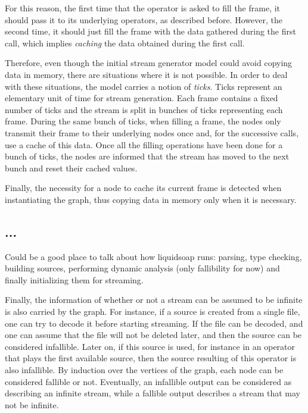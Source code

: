 \documentclass{llncs}
\begin{document}
For this reason, the first time that the operator is asked to fill the frame, it should pass it to its 
underlying operators, as described before. However, the second time, it should just fill the frame 
with the data gathered during the first call, which implies \textit{caching} the data obtained during the first call.

Therefore, even though the initial stream generator model could avoid copying data in memory, there 
are situations where it is not possible. In order to deal with these situations, the 
model carries a notion of \textit{ticks}. Ticks represent an elementary unit of time
for stream generation. Each frame contains a fixed number of ticks and the stream is split
in bunches of ticks representing each frame. During the same bunch of ticks, when filling a frame, the nodes only 
transmit their frame to their underlying nodes once and, for the successive calls, use a cache of this data. 
Once all the filling operations have been done for a bunch of ticks, the nodes are informed that the 
stream has moved to the next bunch and reset their cached values. 

Finally, the necessity for a node to cache its current frame is detected when instantiating the graph, thus
copying data in memory only when it is necessary.

\subsection{...}

Could be a good place to talk about how liquidsoap runs: parsing, type 
checking, building sources, performing dynamic analysis (only fallibility for 
now) and finally initializing them for streaming.

Finally, the information of whether or not a stream can be assumed to be infinite is also carried by the 
graph. For instance, if a source is created from a single file, one can try to decode it before starting 
streaming. If the file can be decoded, and one can assume that the file will not be deleted later, and then 
the source can be considered infallible. Later on, if this source is used, for instance in an operator that plays 
the first available source, then the source resulting of this operator is also infallible.
By induction over the vertices of the graph, each node can be considered fallible or not. Eventually,
an infallible output can be considered as describing an infinite stream, while a fallible
output describes a stream that may not be infinite.
\end{document}
